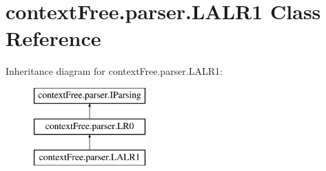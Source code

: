 \hypertarget{classcontext_free_1_1parser_1_1_l_a_l_r1}{\section{context\-Free.\-parser.\-L\-A\-L\-R1 Class Reference}
\label{classcontext_free_1_1parser_1_1_l_a_l_r1}
}
Inheritance diagram for context\-Free.\-parser.\-L\-A\-L\-R1\-:\begin{figure}[H]
\begin{center}
\leavevmode
\includegraphics[height=3.000000cm]{classcontext_free_1_1parser_1_1_l_a_l_r1}
\end{center}
\end{figure}
